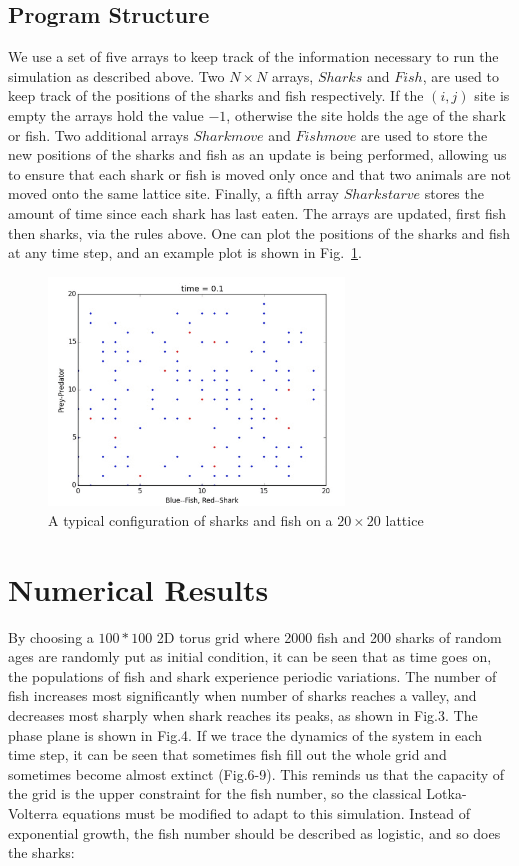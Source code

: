 \documentclass[aps,prl,preprint,superscriptaddress]{revtex4}
\begin{document}
\subsection{Program Structure}
We use a set of five arrays to keep track of the information necessary to run the simulation as described above. Two $N \times N$ arrays, $Sharks$ and $Fish$, are used to keep track of the positions of the sharks and fish respectively. If the $(i,j)$ site is empty the arrays hold the value $-1$, otherwise the site holds the age of the shark or fish. Two additional arrays $Sharkmove$ and $Fishmove$ are used to store the new positions of the sharks and fish as an update is being performed, allowing us to ensure that each shark or fish is moved only once and that two animals are not moved onto the same lattice site. Finally, a fifth array $Sharkstarve$ stores the amount of time since each shark has last eaten. The arrays are updated, first fish then sharks, via the rules above. One can plot the positions of the sharks and fish at any time step, and an example plot is shown in Fig.~\ref{ex}.

\begin{figure}[H]
	\centering
	\includegraphics[width = 0.7\textwidth]{example}
	\caption{A typical configuration of sharks and fish on a $20 \times 20$ lattice}
	\label{ex} 
\end{figure}


\section{Numerical Results}

By choosing a $100*100$ 2D torus grid where 2000 fish and 200 sharks of random ages are randomly put as initial condition, it can be seen that as time goes on, the populations of fish and shark experience periodic variations. The number of fish increases most significantly when number of sharks reaches a valley, and decreases most sharply when shark reaches its peaks, as shown in Fig.3. The phase plane is shown in Fig.4. If we trace the dynamics of the system in each time step, it can be seen that sometimes fish fill out the whole grid and sometimes become almost extinct (Fig.6-9). This reminds us that the capacity of the grid is the upper constraint for the fish number, so the classical Lotka-Volterra equations must be modified to adapt to this simulation. Instead of exponential growth, the fish number should be described as logistic, and so does the sharks:
\end{document}
